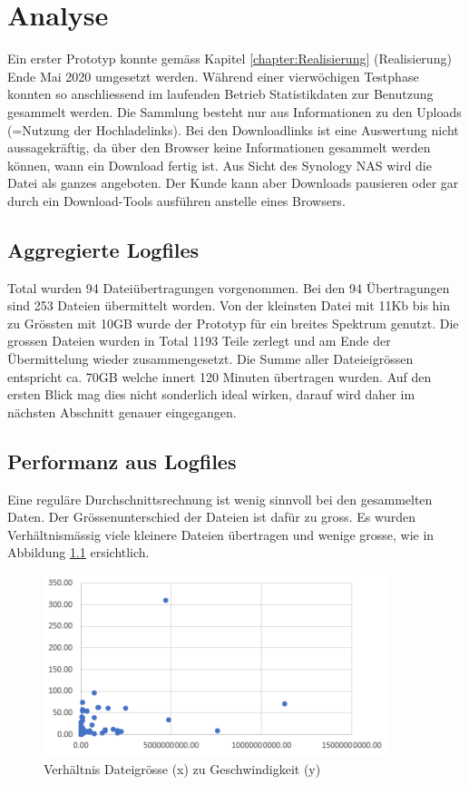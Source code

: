 \chapter{Analyse}
Ein erster Prototyp konnte gemäss Kapitel \ref{chapter:Realisierung} (Realisierung) Ende Mai 2020 umgesetzt werden.
Während einer vierwöchigen Testphase konnten so anschliessend im laufenden Betrieb Statistikdaten zur Benutzung gesammelt werden.
Die Sammlung besteht nur aus Informationen zu den Uploads (=Nutzung der Hochladelinks).
Bei den Downloadlinks ist eine Auswertung nicht aussagekräftig, da über den Browser keine Informationen gesammelt werden können, wann ein Download fertig ist. 
Aus Sicht des Synology NAS wird die Datei als ganzes angeboten. Der Kunde kann aber Downloads pausieren oder gar durch ein Download-Tools ausführen anstelle eines Browsers.

\section{Aggregierte Logfiles}
Total wurden 94 Dateiübertragungen vorgenommen. Bei den 94 Übertragungen sind 253 Dateien übermittelt worden.
Von der kleinsten Datei mit 11Kb bis hin zu Grössten mit 10GB wurde der Prototyp für ein breites Spektrum genutzt.
Die grossen Dateien wurden in Total 1193 Teile zerlegt und am Ende der Übermittelung wieder zusammengesetzt. 
Die Summe aller Dateieigrössen entspricht ca. 70GB welche innert 120 Minuten übertragen wurden. 
Auf den ersten Blick mag dies nicht sonderlich ideal wirken, darauf wird daher im nächsten Abschnitt genauer eingegangen.

\section{Performanz aus Logfiles}
Eine reguläre Durchschnittsrechnung ist wenig sinnvoll bei den gesammelten Daten. 
Der Grössenunterschied der Dateien ist dafür zu gross. Es wurden Verhältnismässig viele kleinere Dateien übertragen und wenige grosse,
wie in Abbildung \ref{fig:diagramme2} ersichtlich.

\begin{figure}[!h]
    \centering
    \includegraphics[width=0.5\linewidth]{content/images/diagramme2.png}
    \caption{Verhältnis Dateigrösse (x) zu Geschwindigkeit (y)}
    \label{fig:diagramme2}
\end{figure} 


